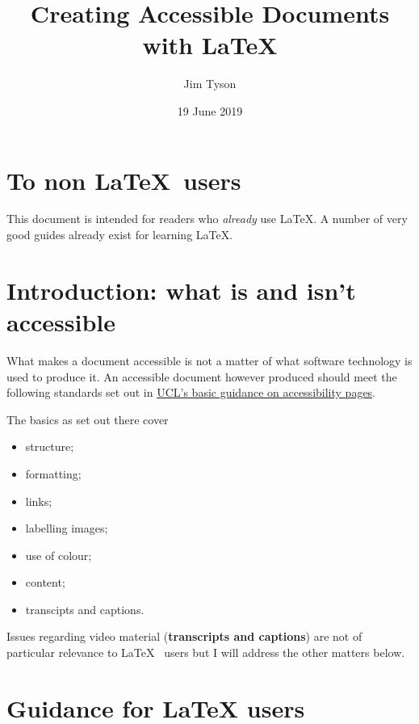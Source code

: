 \documentclass[]{article}
\title{Creating Accessible Documents with LaTeX}
\author{Jim Tyson}
\date{19 June 2019}
\providecommand{\tightlist}{%
  \setlength{\itemsep}{0pt}\setlength{\parskip}{0pt}}
\begin{document}
\maketitle

{
\setcounter{tocdepth}{2}
\tableofcontents
}
\hypertarget{to-non-users}{%
\section{\texorpdfstring{To non
\LaTeX~users}{To non ~users}}\label{to-non-users}}

This document is intended for readers who \emph{already} use \LaTeX. A
number of very good guides already exist for learning \LaTeX.

\hypertarget{introduction-what-is-and-isnt-accessible}{%
\section{Introduction: what is and isn't
accessible}\label{introduction-what-is-and-isnt-accessible}}

What makes a document accessible is not a matter of what software
technology is used to produce it. An accessible document however
produced should meet the following standards set out in
\href{https://www.ucl.ac.uk/isd/services/websites-apps/creating-accessible-content/accessibility-fundamentals}{UCL's
basic guidance on accessibility pages}.

The basics as set out there cover

\begin{itemize}
\tightlist
\item
  structure;
\item
  formatting;
\item
  links;
\item
  labelling images;
\item
  use of colour;
\item
  content;%
\item
  transcipts and captions.
\end{itemize}

Issues regarding video material (\textbf{transcripts and captions}) are
not of particular relevance to \LaTeX~ users but I will address the
other matters below.

\hypertarget{guidance-for-latex-users}{%
\section{Guidance for LaTeX users}\label{guidance-for-latex-users}}
\end{document}
